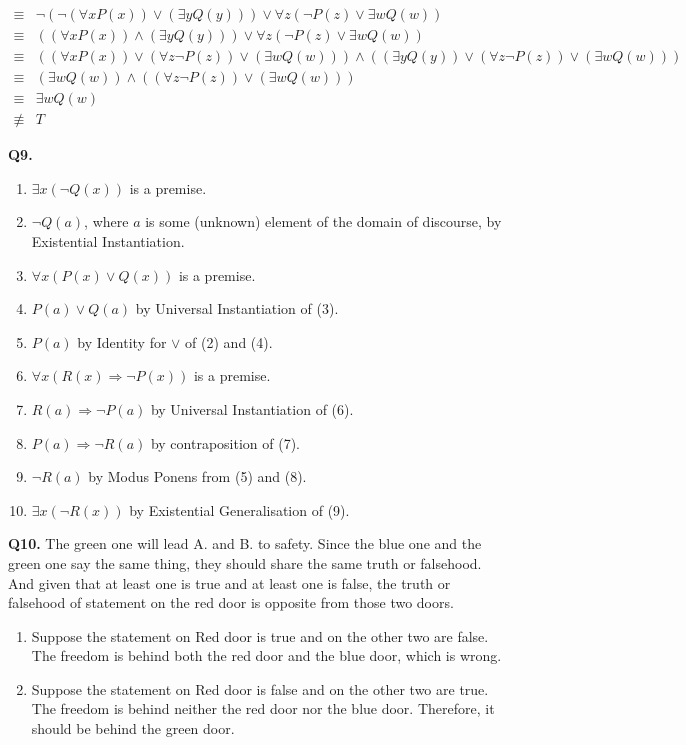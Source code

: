 \documentclass{article}[12pt]
\begin{document}
\begin{enumerate}[(i)]
\begin{align*}
\equiv & \neg (\neg (\forall x P(x)) \vee (\exists y Q(y))) \vee \forall z(\neg P(z) \vee \exists w Q(w))\\
\equiv & ((\forall x P(x))\wedge (\exists y Q(y)) )\vee \forall z(\neg P(z) \vee \exists w Q(w))\\
\equiv & ((\forall x P(x))\vee  (\forall z\neg P(z)) \vee (\exists w Q(w)))\wedge ((\exists y Q(y))\vee (\forall z\neg P(z) )\vee (\exists w Q(w)))\\
\equiv & (\exists w Q(w)) \wedge ((\forall z\neg P(z) )\vee (\exists w Q(w)))\\
\equiv & \exists w Q(w)\\
\not\equiv & T
\end{align*}
\end{enumerate}

\noindent \textbf{Q9.}
\begin{enumerate}
\item $\exists x(\neg Q(x))$ is a premise.
\item $\neg Q(a)$, where $a$ is some (unknown) element of the domain of discourse, by Existential Instantiation.
\item $\forall x(P(x) \vee Q(x))$ is a premise.
\item $P(a) \vee Q(a)$ by Universal Instantiation of (3).
\item $P(a)$ by Identity for $\vee$ of (2) and (4).
\item $\forall x(R(x) \Rightarrow \neg P(x))$ is a premise.
\item $R(a) \Rightarrow \neg P(a)$ by Universal Instantiation of (6).
\item $P(a)\Rightarrow \neg R(a)$ by contraposition of (7).
\item $\neg R(a)$ by Modus Ponens from (5) and (8).
\item $\exists x(\neg R(x))$ by Existential Generalisation of (9).
\end{enumerate}


\noindent \textbf{Q10.}
The green one will lead A. and B. to safety. 
Since the blue one and the green one say the same thing, they should share the same truth or falsehood. And given that at least one is true and at least one is false, the truth or falsehood of statement on the red door is opposite from those two doors.\\
\begin{enumerate}
\item Suppose the statement on Red door is true and on the other two are false. The freedom is behind both the red door and the blue door, which is wrong.
\item Suppose the statement on Red door is false and on the other two are true. The freedom is behind neither the red door nor the blue door. Therefore, it should be behind the green door.
\end{enumerate}










\end{document}
